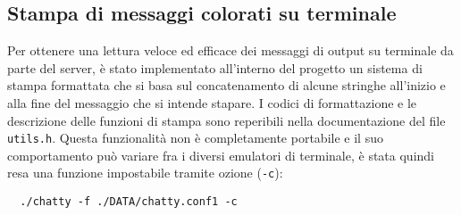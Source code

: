 \documentclass[a4paper,12pt]{report}
\begin{document}
\subsection*{Stampa di messaggi colorati su terminale}
Per ottenere una lettura veloce ed efficace dei messaggi di output su terminale da parte del server, è stato implementato all'interno del progetto un sistema di stampa formattata che si basa sul concatenamento di alcune stringhe all'inizio e alla fine del messaggio che si intende stapare. I codici di formattazione e le descrizione delle funzioni di stampa sono reperibili nella documentazione del file \texttt{utils.h}. Questa funzionalità non è completamente portabile e il suo comportamento può variare fra i diversi emulatori di terminale, è stata quindi resa una funzione impostabile tramite ozione (\texttt{-c}):
\begin{verbatim}
  ./chatty -f ./DATA/chatty.conf1 -c
\end{verbatim}
\end{document}
